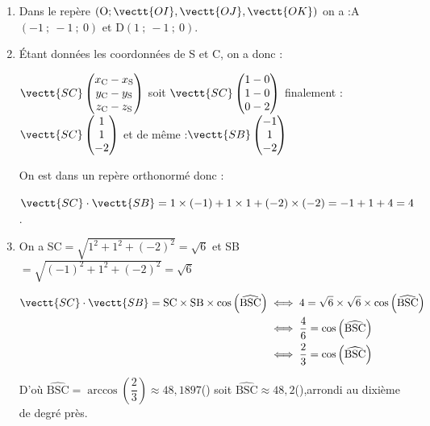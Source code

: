 \begin{enumerate}
\item %

Dans le repère $\left(\mathrm{O}; \vectt{OI}, \vectt{OJ}, \vectt{OK}\right)$ on a :\quad A$(-1~;~-1~;~0)$ \quad et \quad D$(1~;~-1~;~0)$.

\item Étant données les coordonnées de S et C, on a donc :

$\vectt{SC}\begin{pmatrix}	x_\mathrm{C}-x_\mathrm{S} \\ y_\mathrm{C}-y_\mathrm{S}\\ z_\mathrm{C}-z_\mathrm{S} \end{pmatrix}$ \quad soit \quad $\vectt{SC}\begin{pmatrix}	1-0 \\ 1-0\\ 0-2 \end{pmatrix}$ \quad finalement :\quad $\vectt{SC}\begin{pmatrix}	1 \\1\\-2 \end{pmatrix}$
\quad et de même :\quad $\vectt{SB}\begin{pmatrix}	-1 \\1\\-2 \end{pmatrix}$

On est dans un repère orthonormé donc :

$\vectt{SC}\cdot\vectt{SB}= 1 \times (-1) + 1 \times 1 + (-2) \times (-2) = -1 +1+4=4$.

\item On a SC$=\sqrt{ 1^2+1^2+(-2)^2} = \sqrt{6}$ \quad et \quad SB$=\sqrt{ (-1)^2+1^2+(-2)^2} = \sqrt{6}$

$	\begin{aligned} \vectt{SC}\cdot\vectt{SB} = \mathrm{SC} \times \mathrm{SB} \times \cos\left(\widehat{\mathrm{BSC}}\right) & \iff 4 = \sqrt{6} \times \sqrt{6} \times \cos\left(\widehat{\mathrm{BSC}}\right) \\
			& \iff \dfrac{4}{6} = \cos\left(\widehat{\mathrm{BSC}}\right) \\
				& \iff \dfrac{2}{3} = \cos\left(\widehat{\mathrm{BSC}}\right) \\
			\end{aligned} $

	D'où \quad $\widehat{\mathrm{BSC}} = \arccos\left(\dfrac{2}{3}\right) \approx 48,1897$(\degre) \quad soit \quad $\widehat{\mathrm{BSC}} \approx 48,2 $(\degre),\quad arrondi au dixième de degré près.
	\end{enumerate}


